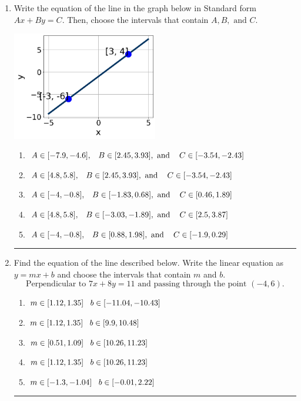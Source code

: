 \documentclass[14pt]{extbook}
\newcommand{\litem}[1]{\item#1\hspace*{-1cm}\rule{\textwidth}{0.4pt}}
\begin{document}
\begin{enumerate}
{\begin{enumerate}[label=\Alph*.]
\end{enumerate} }
\litem{
Write the equation of the line in the graph below in Standard form $Ax+By=C$. Then, choose the intervals that contain $A, B, \text{ and } C$.
\begin{center}
    \includegraphics[width=0.5\textwidth]{../Figures/linearGraphToStandardCopyB.png}
\end{center}
\begin{enumerate}[label=\Alph*.]
\item \( A \in [-7.9, -4.6], \hspace{3mm} B \in [2.45, 3.93], \text{ and } \hspace{3mm} C \in [-3.54, -2.43] \)
\item \( A \in [4.8, 5.8], \hspace{3mm} B \in [2.45, 3.93], \text{ and } \hspace{3mm} C \in [-3.54, -2.43] \)
\item \( A \in [-4, -0.8], \hspace{3mm} B \in [-1.83, 0.68], \text{ and } \hspace{3mm} C \in [0.46, 1.89] \)
\item \( A \in [4.8, 5.8], \hspace{3mm} B \in [-3.03, -1.89], \text{ and } \hspace{3mm} C \in [2.5, 3.87] \)
\item \( A \in [-4, -0.8], \hspace{3mm} B \in [0.88, 1.98], \text{ and } \hspace{3mm} C \in [-1.9, 0.29] \)

\end{enumerate} }
\litem{
Find the equation of the line described below. Write the linear equation as $ y=mx+b $ and choose the intervals that contain $m$ and $b$.\[ \text{Perpendicular to } 7 x + 8 y = 11 \text{ and passing through the point } (-4, 6). \]\begin{enumerate}[label=\Alph*.]
\item \( m \in [1.12, 1.35] \hspace*{3mm} b \in [-11.04, -10.43] \)
\item \( m \in [1.12, 1.35] \hspace*{3mm} b \in [9.9, 10.48] \)
\item \( m \in [0.51, 1.09] \hspace*{3mm} b \in [10.26, 11.23] \)
\item \( m \in [1.12, 1.35] \hspace*{3mm} b \in [10.26, 11.23] \)
\item \( m \in [-1.3, -1.04] \hspace*{3mm} b \in [-0.01, 2.22] \)


\end{enumerate}}
\end{enumerate}
\end{document}

